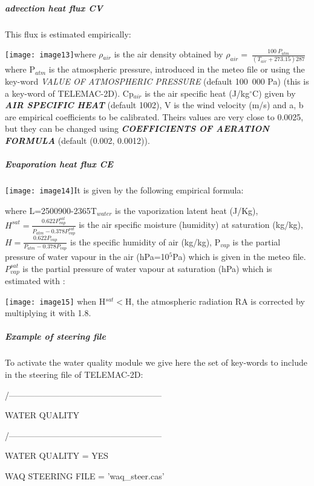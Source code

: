 \documentclass{article} %
\begin{document}
\subparagraph{ advection heat flux CV}

 This flux is estimated empirically:

 \texttt{[image: image13]}where $\rho$${}_{air}$ is the air density obtained by ${\rho }_{air}=\ \frac{100\ P_{atm}}{\left(T_{air}+273.15\right)287}$ where P${}_{atm}$ is the atmospheric pressure, introduced in the meteo file or using the key-word \textit{VALUE OF ATMOSPHERIC PRESSURE} (default 100~000 Pa) (this is a key-word of TELEMAC-2D). Cp${}_{air}$ is the air specific heat (J/kg${}^\circ$C) given by \textbf{\textit{AIR SPECIFIC HEAT}} (default 1002), V is the wind velocity (m/s) and a, b are empirical coefficients to be calibrated. Theirs values are very close to 0.0025, but they can be changed using \textbf{\textit{COEFFICIENTS OF AERATION FORMULA}} (default (0.002, 0.0012)).


\subparagraph{ Evaporation heat flux CE}

 \texttt{[image: image14]}It is given by the following empirical formula:

 where L=2500900-2365T${}_{water}$ is the vaporization latent heat (J/Kg), $H^{sat}=\frac{0.622P^{sat}_{vap}}{P_{atm}-0.378P^{sat}_{vap}}$ is the air specific moisture (humidity) at saturation (kg/kg), $H=\frac{0.622P_{vap}}{P_{atm}-0.378P_{vap}}$ is the specific humidity of air (kg/kg), P${}_{vap}$ is the partial pressure of water vapour in the air (hPa=10${}^{5}$Pa) which is given in the meteo file. $P^{sat}_{vap}$ is the partial pressure of water vapour at saturation (hPa) which is estimated with :

 \texttt{[image: image15]} when H${}^{sat}$$<$H, the atmospheric radiation RA is corrected by multiplying it with 1.8.


\subparagraph{ Example of steering file}

 To activate the water quality module we give here the set of key-words to include in the steering file of TELEMAC-2D:

 /------------------------------------------------------

   WATER QUALITY

 /------------------------------------------------------

 WATER QUALITY           = YES

 WAQ STEERING FILE    = 'waq\_steer.cas'
\end{document}
